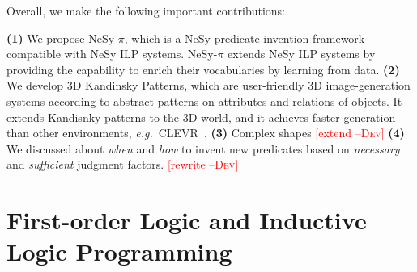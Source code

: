 \documentclass[
]{ceurart}
\newcommand{\dd}[1]{\textcolor{red}{[#1 \textsc{--Dev}]}}
\newcommand{\hk}[1]{\textcolor{Apricot}{[#1 \textsc{--HK}]}}
\newcommand{\eg}{\emph{e.g.}~}
\begin{document}
	
	
	
	Overall, we make the following important contributions:
	
		\textbf{(1)} We propose NeSy-$\pi$, which is a NeSy predicate invention framework compatible with NeSy ILP systems. NeSy-$\pi$ extends NeSy ILP systems by providing the capability to enrich their vocabularies by learning from data.
		\textbf{(2)} We develop $3$D Kandinsky Patterns, which are user-friendly 3D image-generation systems according to abstract patterns on attributes and relations of objects. It extends Kandisnky patterns to the 3D world, and it achieves faster generation than other environments, \eg CLEVR~\cite{}.
		\textbf{(3)} Complex shapes \dd{extend}
		\textbf{(4)} We discussed about \textit{when} and \textit{how} to invent new predicates based on \textit{necessary} and \textit{sufficient} judgment factors. \dd{rewrite}
	
	\section{First-order Logic and Inductive Logic Programming}
	
\end{document}
